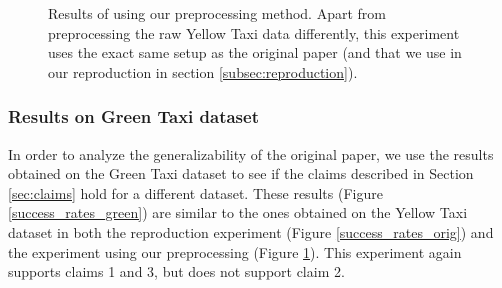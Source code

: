 \begin{figure}[H]
\centering
\captionsetup{justification=centering}
\caption{Results of using our preprocessing method. Apart from preprocessing the raw Yellow Taxi data differently, this experiment uses the exact same setup as the original paper (and that we use in our reproduction in section \ref{subsec:reproduction}).}
\label{success_rates_own_method}
\end{figure}


\subsubsection{Results on Green Taxi dataset}
\label{section:owndata}
In order to analyze the generalizability of the original paper, we use the results obtained on the Green Taxi dataset to see if the claims described in Section \ref{sec:claims} hold for a different dataset. These results (Figure \ref{success_rates_green}) are similar to the ones obtained on the Yellow Taxi dataset in both the reproduction experiment (Figure \ref{success_rates_orig}) and the experiment using our preprocessing (Figure \ref{success_rates_own_method}). This experiment again supports claims 1 and 3, but does not support claim 2.

